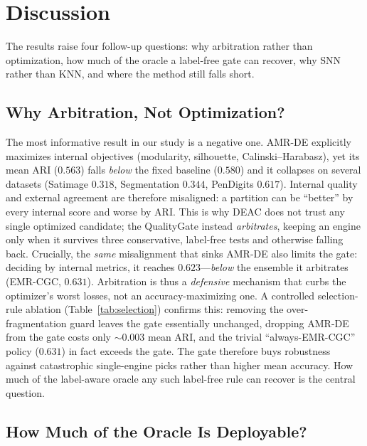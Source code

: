 \documentclass[journal]{IEEEtran}
\begin{document}
\section{Discussion}\label{sec:disc}

The results raise four follow-up questions: why arbitration rather than optimization, how much of the oracle a label-free gate can recover, why SNN rather than KNN, and where the method still falls short.

\subsection{Why Arbitration, Not Optimization?}

The most informative result in our study is a negative one. AMR-DE
explicitly maximizes internal objectives (modularity, silhouette,
Calinski--Harabasz), yet its mean ARI ($0.563$) falls \emph{below} the fixed
baseline ($0.580$) and it collapses on several datasets (Satimage $0.318$,
Segmentation $0.344$, PenDigits $0.617$). Internal quality and external
agreement are therefore misaligned: a partition can be ``better'' by every
internal score and worse by ARI. This is why DEAC does not trust any single
optimized candidate; the QualityGate instead \emph{arbitrates}, keeping an
engine only when it survives three conservative, label-free tests and otherwise
falling back. Crucially, the \emph{same} misalignment that sinks AMR-DE also
limits the gate: deciding by internal metrics, it reaches $0.623$---\emph{below}
the ensemble it arbitrates (EMR-CGC, $0.631$). Arbitration is thus a
\emph{defensive} mechanism that curbs the optimizer's worst losses, not an
accuracy-maximizing one. A controlled selection-rule ablation
(Table~\ref{tab:selection}) confirms this: removing the over-fragmentation guard
leaves the gate essentially unchanged, dropping AMR-DE from the gate costs only
${\sim}0.003$ mean ARI, and the trivial ``always-EMR-CGC'' policy ($0.631$) in
fact exceeds the gate. The gate therefore buys robustness against catastrophic
single-engine picks rather than higher mean accuracy. How much of the label-aware
oracle any such label-free rule can recover is the central question.



\subsection{How Much of the Oracle Is Deployable?}
\end{document}
